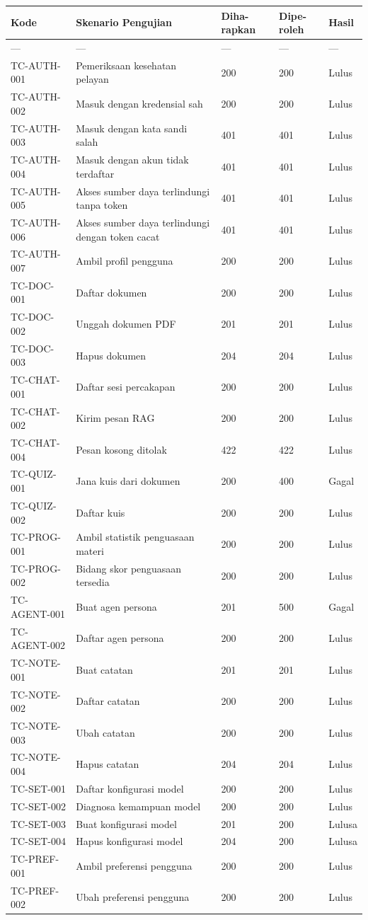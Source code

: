 \documentclass[12pt,a4paper]{article}
\begin{document}
\begin{table}[h]
\centering
\begin{tabular}{lllll}
\toprule
Kode & Skenario Pengujian & Diha-rapkan & Dipe-roleh & Hasil \\
\midrule
--- & --- & --- & --- & --- \\
TC-AUTH-001 & Pemeriksaan kesehatan pelayan & 200 & 200 & Lulus \\
TC-AUTH-002 & Masuk dengan kredensial sah & 200 & 200 & Lulus \\
TC-AUTH-003 & Masuk dengan kata sandi salah & 401 & 401 & Lulus \\
TC-AUTH-004 & Masuk dengan akun tidak terdaftar & 401 & 401 & Lulus \\
TC-AUTH-005 & Akses sumber daya terlindungi tanpa token & 401 & 401 & Lulus \\
TC-AUTH-006 & Akses sumber daya terlindungi dengan token cacat & 401 & 401 & Lulus \\
TC-AUTH-007 & Ambil profil pengguna & 200 & 200 & Lulus \\
TC-DOC-001 & Daftar dokumen & 200 & 200 & Lulus \\
TC-DOC-002 & Unggah dokumen PDF & 201 & 201 & Lulus \\
TC-DOC-003 & Hapus dokumen & 204 & 204 & Lulus \\
TC-CHAT-001 & Daftar sesi percakapan & 200 & 200 & Lulus \\
TC-CHAT-002 & Kirim pesan RAG & 200 & 200 & Lulus \\
TC-CHAT-004 & Pesan kosong ditolak & 422 & 422 & Lulus \\
TC-QUIZ-001 & Jana kuis dari dokumen & 200 & 400 & Gagal \\
TC-QUIZ-002 & Daftar kuis & 200 & 200 & Lulus \\
TC-PROG-001 & Ambil statistik penguasaan materi & 200 & 200 & Lulus \\
TC-PROG-002 & Bidang skor penguasaan tersedia & 200 & 200 & Lulus \\
TC-AGENT-001 & Buat agen persona & 201 & 500 & Gagal \\
TC-AGENT-002 & Daftar agen persona & 200 & 200 & Lulus \\
TC-NOTE-001 & Buat catatan & 201 & 201 & Lulus \\
TC-NOTE-002 & Daftar catatan & 200 & 200 & Lulus \\
TC-NOTE-003 & Ubah catatan & 200 & 200 & Lulus \\
TC-NOTE-004 & Hapus catatan & 204 & 204 & Lulus \\
TC-SET-001 & Daftar konfigurasi model & 200 & 200 & Lulus \\
TC-SET-002 & Diagnosa kemampuan model & 200 & 200 & Lulus \\
TC-SET-003 & Buat konfigurasi model & 201 & 200 & Lulusa \\
TC-SET-004 & Hapus konfigurasi model & 204 & 200 & Lulusa \\
TC-PREF-001 & Ambil preferensi pengguna & 200 & 200 & Lulus \\
TC-PREF-002 & Ubah preferensi pengguna & 200 & 200 & Lulus \\
\bottomrule
\end{tabular}
\end{table}
\end{document}
